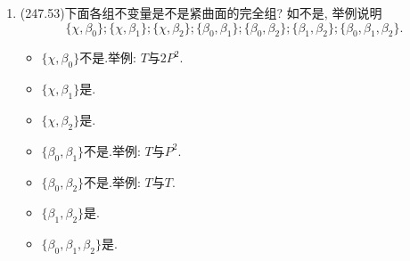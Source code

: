 \begin{enumerate}
\begin{proofc}[解答]
\begin{center}
\end{center}
\end{proofc}
\item(247.53)下面各组不变量是不是紧曲面的完全组? 如不是, 举例说明
    \[
        \{ \chi, \beta_0 \}; \{ \chi, \beta_1 \}; \{ \chi, \beta_2 \}; \{ \beta_0, \beta_1 \}; \{ \beta_0, \beta_2 \}; \{ \beta_1, \beta_2 \}; \{ \beta_0, \beta_1, \beta_2 \}.
    \]
\begin{proofc}[解答]
\begin{itemize}
    \item $\{\chi,\beta_0\}$不是.举例: $T$与$2P^2$.
    \item $\{\chi,\beta_1\}$是.
    \item $\{\chi,\beta_2\}$是.
    \item $\{\beta_0,\beta_1\}$不是.举例: $T$与$P^2$.
    \item $\{\beta_0,\beta_2\}$不是.举例: $T$与$T$.
    \item $\{\beta_1,\beta_2\}$是.
    \item $\{\beta_0,\beta_1,\beta_2\}$是.\qedhere
\end{itemize}
\end{proofc}
\end{enumerate}

